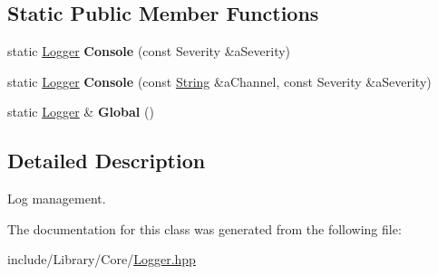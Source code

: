 \subsection*{Static Public Member Functions}
\begin{DoxyCompactItemize}
\item 
\mbox{\label{classlibrary_1_1core_1_1_logger_a2f0a86c1a3237b8023efdbc3727dbb5a}} 
static \hyperlink{classlibrary_1_1core_1_1_logger}{Logger} {\bfseries Console} (const Severity \&a\+Severity)
\item 
\mbox{\label{classlibrary_1_1core_1_1_logger_a07e56c9a149007c30220eb9538e3b273}} 
static \hyperlink{classlibrary_1_1core_1_1_logger}{Logger} {\bfseries Console} (const \hyperlink{classlibrary_1_1core_1_1types_1_1_string}{String} \&a\+Channel, const Severity \&a\+Severity)
\item 
\mbox{\label{classlibrary_1_1core_1_1_logger_a0b20a0248c34a111c7a18043185586ff}} 
static \hyperlink{classlibrary_1_1core_1_1_logger}{Logger} \& {\bfseries Global} ()
\end{DoxyCompactItemize}


\subsection{Detailed Description}
Log management. 

The documentation for this class was generated from the following file\+:\begin{DoxyCompactItemize}
\item 
include/\+Library/\+Core/\hyperlink{_logger_8hpp}{Logger.\+hpp}\end{DoxyCompactItemize}

